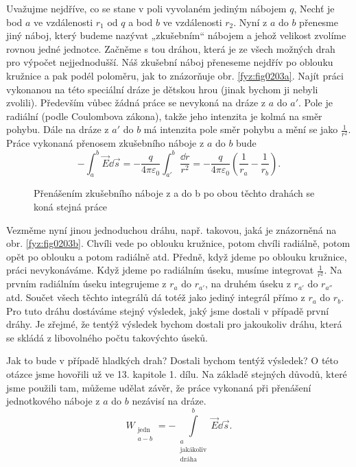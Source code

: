     Uvažujme nejdříve, co se stane v poli vyvolaném jediným nábojem \(q\), Nechť je bod \(a\) ve 
    vzdálenosti \(r_1\) od \(q\) a bod \(b\) ve vzdálenosti \(r_2\). Nyní z \(a\) do \(b\) přenesme 
    jiný náboj, který budeme nazývat „zkušebním“ nábojem a jehož velikost zvolíme rovnou jedné 
    jednotce. Začněme s tou dráhou, která je ze všech možných drah pro výpočet nejjednodušší. Náš 
    zkušební náboj přeneseme nejdřív po oblouku kružnice a pak podél poloměru, jak to znázorňuje 
    obr. \ref{fyz:fig0203a}. Najít práci vykonanou na této speciální dráze je dětskou hrou 
    (jinak bychom ji nebyli zvolili). Především vůbec žádná práce se nevykoná na dráze z \(a\) do 
    \(a'\). Pole je radiální (podle Coulombova zákona), takže jeho intenzita je kolmá na směr 
    pohybu. Dále na dráze z \(a'\) do \(b\) má intenzita pole směr pohybu a mění se jako 
    \(\frac{1}{r^2}\). Práce vykonaná přenosem zkušebního náboje z \(a\) do \(b\) bude
    \begin{equation}\label{fyz:eq286}
     -\int_{a}^{b}\vec{E}\dd{\vec{s}} = 
       -\frac{q}{4\pi\varepsilon_0}\int_{a'}^{b}\frac{\dd{r}}{r^2} = 
       -\frac{q}{4\pi\varepsilon_0}\left(\frac{1}{r_{a}}-\frac{1}{r_{b}}\right).  
    \end{equation}
    \begin{figure}[ht!]
      \centering
      \caption{Přenášením zkušebního náboje z a do b po obou těchto drahách se koná stejná práce}
      \label{fyz:fig0203}
    \end{figure}
    
    Vezměme nyní jinou jednoduchou dráhu, např. takovou, jaká je znázorněná na obr. 
    \ref{fyz:fig0203b}. Chvíli vede po oblouku kružnice, potom chvíli radiálně, potom  opět 
    po oblouku a potom radiálně atd. Předně, když jdeme po oblouku kružnice, práci nevykonáváme. 
    Když jdeme po radiálním úseku, musíme integrovat \(\frac{1}{r^2}\). Na prvním radiálním úseku 
    integrujeme z \(r_{a}\) do \(r_{a'}\), na druhém úseku z \(r_{a'}\) do \(r_{a''}\) atd. Součet 
    všech těchto integrálů dá totéž jako jediný integrál přímo z \(r_{a}\) do \(r_{b}\). Pro tuto 
    dráhu dostáváme stejný výsledek, jaký jsme dostali v případě první dráhy. Je zřejmé, že tentýž 
    výsledek bychom dostali pro jakoukoliv dráhu, která se skládá z libovolného počtu takovýchto 
    úseků.
    
    Jak to bude v případě hladkých drah? Dostali bychom tentýž výsledek? O této otázce jsme 
    hovořili už ve 13. kapitole 1. dílu. Na základě stejných důvodů, které jsme použili tam, můžeme 
    udělat závěr, že práce vykonaná při přenášení jednotkového náboje z \(a\) do \(b\) nezávisí na 
    dráze.   
    \begin{equation*}
      W_{\substack{\text{jedn}\\ a-b}} = 
       - \int\limits_{\substack{a\\\text{jakákoliv}\\\text{dráha}}}^b\vec{E}\dd{\vec{s}}.
    \end{equation*}      


